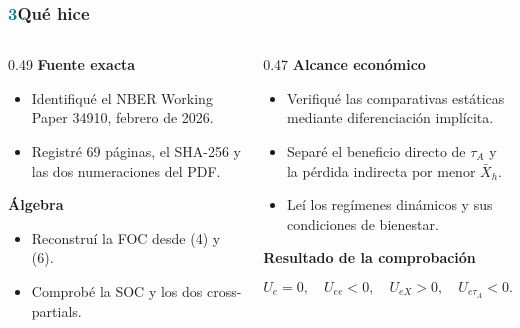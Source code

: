 \documentclass[12pt,aspectratio=169]{beamer}
\begin{document}
\begin{frame}
  \frametitle{\textcolor{Teal}{3}\quad Qué hice}

  \small
  \begin{columns}[T,onlytextwidth]
    \begin{column}{0.49\textwidth}
      {\color{Teal}\bfseries Fuente exacta}
      \begin{itemize}
        \item Identifiqué el NBER Working Paper 34910, febrero de 2026.
        \item Registré 69 páginas, el SHA-256 y las dos numeraciones del PDF.
      \end{itemize}

      \vspace{0.02cm}
      {\color{Teal}\bfseries Álgebra}
      \begin{itemize}
        \item Reconstruí la FOC desde (4) y (6).
        \item Comprobé la SOC y los dos cross-partials.
      \end{itemize}
    \end{column}

    \begin{column}{0.47\textwidth}
      {\color{Teal}\bfseries Alcance económico}
      \begin{itemize}
        \item Verifiqué las comparativas estáticas mediante diferenciación implícita.
        \item Separé el beneficio directo de \(\tau_A\) y la pérdida indirecta por menor \(\bar X_h\).
        \item Leí los regímenes dinámicos y sus condiciones de bienestar.
      \end{itemize}

      \vspace{0.03cm}
      {\color{Teal}\bfseries Resultado de la comprobación}

      {\scriptsize
      \[
      U_e=0,\quad U_{ee}<0,\quad
      U_{eX}>0,\quad U_{e\tau_A}<0 .
      \]}
    \end{column}
  \end{columns}
\end{frame}
\end{document}
